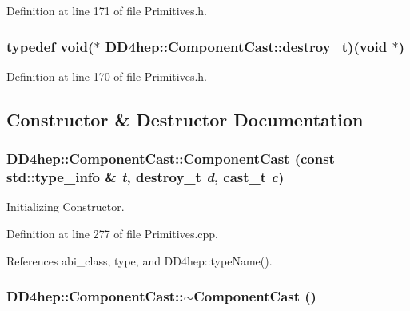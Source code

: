 Definition at line 171 of file Primitives.h.\hypertarget{class_d_d4hep_1_1_component_cast_a60cfc51ff4c1b324e86c3f6b4bf4ba55}{
\subsubsection[{destroy\_\-t}]{\setlength{\rightskip}{0pt plus 5cm}typedef void($\ast$ {\bf DD4hep::ComponentCast::destroy\_\-t})(void $\ast$)}}
\label{class_d_d4hep_1_1_component_cast_a60cfc51ff4c1b324e86c3f6b4bf4ba55}


Definition at line 170 of file Primitives.h.

\subsection{Constructor \& Destructor Documentation}
\hypertarget{class_d_d4hep_1_1_component_cast_a6a1068534a7f7287cd1f4a342c34a91a}{
\subsubsection[{ComponentCast}]{\setlength{\rightskip}{0pt plus 5cm}DD4hep::ComponentCast::ComponentCast (const std::type\_\-info \& {\em t}, \/  {\bf destroy\_\-t} {\em d}, \/  {\bf cast\_\-t} {\em c})}}
\label{class_d_d4hep_1_1_component_cast_a6a1068534a7f7287cd1f4a342c34a91a}


Initializing Constructor. 

Definition at line 277 of file Primitives.cpp.

References abi\_\-class, type, and DD4hep::typeName().\hypertarget{class_d_d4hep_1_1_component_cast_a1554d35b906921cba45fc717702ff8c4}{
\subsubsection[{$\sim$ComponentCast}]{\setlength{\rightskip}{0pt plus 5cm}DD4hep::ComponentCast::$\sim$ComponentCast ()}}
\label{class_d_d4hep_1_1_component_cast_a1554d35b906921cba45fc717702ff8c4}


